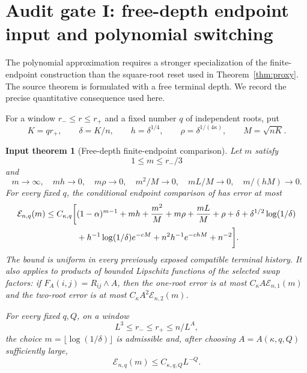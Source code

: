 \documentclass[11pt]{article}
\newtheorem{inputtheorem}[theorem]{Input theorem}
\theoremstyle{remark}
\begin{document}
\section{Audit gate I: free-depth endpoint input and polynomial switching}
\label{sec:free-depth-gate}

The polynomial approximation requires a stronger specialization of the
finite-endpoint construction than the square-root reset used in
Theorem~\ref{thm:proxy}.  The source theorem is formulated with a free
terminal depth.  We record the precise quantitative consequence used here.

For a window $r_-\le r\le r_+$ and a fixed number $q$ of independent roots,
put
\[
 K=qr_+,
 \qquad
 \delta=K/n,
 \qquad
 h=\delta^{1/4},
 \qquad
 \rho=\delta^{1/(4\kappa)},
 \qquad
 M=\sqrt{nK}.
\]

\begin{inputtheorem}[Free-depth finite-endpoint comparison]
\label{input:free-depth}
Let $m$ satisfy
\[
 1\le m\le r_-/3
\]
and
\[
 m\to\infty,
 \quad mh\to0,
 \quad m\rho\to0,
 \quad m^2/M\to0,
 \quad mL/M\to0,
 \quad m/(hM)\to0.
\]
For every fixed $q$, the conditional endpoint comparison of
\cite{LongSwitch2026} has error at most
\begin{align}
 \mathcal E_{n,q}(m)\le C_{\kappa,q}\bigg[&
 (1-\alpha)^{m-1}+mh+\frac{m^2}{M}+m\rho+\frac{mL}{M}
 +\rho+\delta+\delta^{1/2}\log(1/\delta)
 \notag\\
 &+h^{-1}\log(1/\delta)e^{-cM}
 +n^2h^{-1}e^{-chM}+n^{-2}\bigg].
 \label{eq:free-depth-input-error}
\end{align}
The bound is uniform in every previously exposed compatible terminal
history.  It also applies to products of bounded Lipschitz functions of the
selected swap factors: if $F_A(i,j)=R_{ij}\wedge A$, then the one-root error
is at most $C_\kappa A\mathcal E_{n,1}(m)$ and the two-root error is at most
$C_\kappa A^2\mathcal E_{n,2}(m)$.

For every fixed $q,Q$, on a window
\[
 L^3\le r_-\le r_+\le n/L^A,
\]
the choice $m=\lfloor\log(1/\delta)\rfloor$ is admissible and, after choosing
$A=A(\kappa,q,Q)$ sufficiently large,
\[
 \mathcal E_{n,q}(m)\le C_{\kappa,q,Q}L^{-Q}.
\]
\end{inputtheorem}
\end{document}
